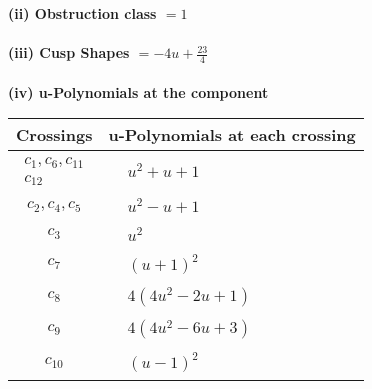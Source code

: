 \documentclass[1p]{elsarticle_modified}
\theoremstyle{definition}
\begin{document}
\flushleft \textbf{(ii) Obstruction class $= 1$}\\~\\
\flushleft \textbf{(iii) Cusp Shapes $= -4 u+\frac{23}{4}$}\\~\\
\newpage\renewcommand{\arraystretch}{1}
\flushleft \textbf{(iv) u-Polynomials at the component}\newline \\
\begin{tabular}{m{50pt}|m{274pt}}
Crossings & \hspace{64pt}u-Polynomials at each crossing \\
\hline $$\begin{aligned}c_{1},c_{6},c_{11}\\c_{12}\end{aligned}$$&$\begin{aligned}
&u^2+u+1
\end{aligned}$\\
\hline $$\begin{aligned}c_{2},c_{4},c_{5}\end{aligned}$$&$\begin{aligned}
&u^2- u+1
\end{aligned}$\\
\hline $$\begin{aligned}c_{3}\end{aligned}$$&$\begin{aligned}
&u^2
\end{aligned}$\\
\hline $$\begin{aligned}c_{7}\end{aligned}$$&$\begin{aligned}
&(u+1)^2
\end{aligned}$\\
\hline $$\begin{aligned}c_{8}\end{aligned}$$&$\begin{aligned}
&4(4 u^2-2 u+1)
\end{aligned}$\\
\hline $$\begin{aligned}c_{9}\end{aligned}$$&$\begin{aligned}
&4(4 u^2-6 u+3)
\end{aligned}$\\
\hline $$\begin{aligned}c_{10}\end{aligned}$$&$\begin{aligned}
&(u-1)^2
\end{aligned}$\\
\hline
\end{tabular}\\~\\
\end{document}
